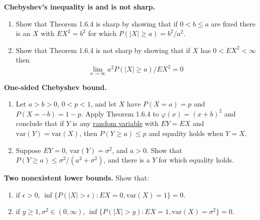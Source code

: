   \begin{exercise}[Durrett 1.6.3]
    \textbf{Chebyshev's inequality is and is not sharp.}
    \begin{enumerate}
      \item Show that Theorem 1.6.4 is sharp by showing that if $0 < b \leq a$ are fixed there is an $X$ with $EX^2 = b^2$ for which $P(|X| \geq a) = b^2/a^2$.
      \item Show that Theorem 1.6.4 is not sharp by showing that if $X$ has $0 < EX^2 < \infty$ then
      \begin{equation*}
        \lim_{a \to \infty} a^2 P(|X| \geq a) / EX^2 = 0
      \end{equation*}
    \end{enumerate}
  \end{exercise}
  \begin{solution}

  \end{solution}

  \begin{exercise}[Durrett 1.6.4]
    \textbf{One-sided Chebyshev bound.}
    \begin{enumerate}
      \item Let $a > b > 0$, $0 < p < 1$, and let $X$ have $P(X = a) = p$ and $P(X = -b) = 1 - p$. Apply Theorem 1.6.4 to $\varphi(x) = (x + b)^2$ and conclude that if $Y$ is any \hyperref[def:random-variable]{random variable} with $EY = EX$ and $\text{var}(Y) = \text{var}(X)$, then $P(Y \geq a) \leq p$ and equality holds when $Y = X$.
      \item Suppose $EY = 0$, $\text{var}(Y) = \sigma^2$, and $a > 0$. Show that $P(Y \geq a) \leq \sigma^2 / (a^2 + \sigma^2)$, and there is a $Y$ for which equality holds.
    \end{enumerate}
  \end{exercise}
  \begin{solution}

  \end{solution}

  \begin{exercise}[Durrett 1.6.5]
    \textbf{Two nonexistent lower bounds.} Show that:
    \begin{enumerate}
      \item if $\epsilon > 0$, $\inf \{P(|X| > \epsilon) : EX = 0, \text{var}(X) = 1\} = 0$.
      \item if $y \geq 1, \sigma^2 \in (0, \infty)$, $\inf \{P(|X| > y) : EX = 1, \text{var}(X) = \sigma^2\} = 0$.
    \end{enumerate}
  \end{exercise}
  \begin{solution}

  \end{solution}

